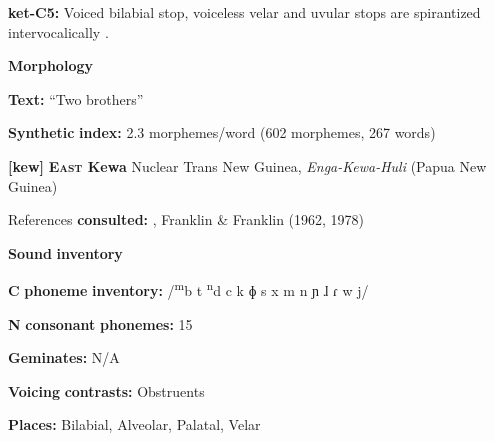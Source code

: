 \begin{styleBody}
\textbf{ket-C5:} Voiced bilabial stop, voiceless velar and uvular stops are spirantized intervocalically \citep[75-8]{Georg2007}.
\end{styleBody}

\begin{styleBody}
\textbf{Morphology}
\end{styleBody}

\begin{styleBody}
\textbf{Text:} “Two brothers” \citep[92-97]{Vajda2004}
\end{styleBody}

\begin{styleBody}
\textbf{Synthetic} \textbf{index:} 2.3 morphemes/word (602 morphemes, 267 words)
\end{styleBody}

\begin{styleBody}
\textbf{[kew]}   \textbf{\textsc{East} \textbf{Kewa}}  Nuclear Trans New Guinea, \textit{Enga-Kewa-Huli} (Papua New Guinea)
\end{styleBody}

\begin{styleBody}
References \textbf{consulted:} \citet{Franklin1971}, Franklin \& Franklin (1962, 1978)
\end{styleBody}

\begin{styleBody}
\textbf{Sound} \textbf{inventory}
\end{styleBody}

\begin{styleBody}
\textbf{C} \textbf{phoneme} \textbf{inventory:} /\textsuperscript{m}b t \textsuperscript{n}d c k ɸ s x m n ɲ ɺ ɾ w j/
\end{styleBody}

\begin{styleBody}
\textbf{N} \textbf{consonant} \textbf{phonemes:} 15
\end{styleBody}

\begin{styleBody}
\textbf{Geminates:} N/A
\end{styleBody}

\begin{styleBody}
\textbf{Voicing} \textbf{contrasts:} Obstruents
\end{styleBody}

\begin{styleBody}
\textbf{Places:} Bilabial, Alveolar, Palatal, Velar
\end{styleBody}


